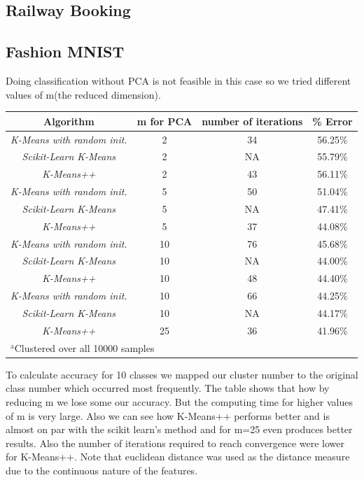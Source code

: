 \documentclass[conference]{IEEEtran}
\begin{document}
\subsection{Railway Booking}

\subsection{Fashion MNIST}
Doing classification without PCA is not feasible in this case so we tried different values of m(the reduced dimension).
\begin{table}[htbp]
\begin{center}
\begin{tabular}{|c|c|c|c|}
\hline
\textbf{Algorithm}&\textbf{m for PCA}&\textbf{number of iterations}&\textbf{\% Error} \\
\hline
\textit{K-Means with random init.} &2&34&56.25\%\\
\hline
\textit{Scikit-Learn K-Means}&2&NA&55.79\%\\
\hline
\textit{K-Means++}&2&43&56.11\%\\
\hline
\textit{K-Means with random init.} &5&50&51.04\%\\
\hline
\textit{Scikit-Learn K-Means}&5&NA&47.41\%\\
\hline
\textit{K-Means++}&5&37&44.08\%\\
\hline
\textit{K-Means with random init.} &10&76&45.68\%\\
\hline
\textit{Scikit-Learn K-Means}&10&NA&44.00\%\\
\hline
\textit{K-Means++}&10&48&44.40\%\\
\hline
\textit{K-Means with random init.} &10&66&44.25\%\\
\hline
\textit{Scikit-Learn K-Means}&10&NA&44.17\%\\
\hline
\textit{K-Means++}&25&36&41.96\%\\
\hline
\multicolumn{4}{l}{$^{\mathrm{a}}$Clustered over all 10000 samples}
\end{tabular}
\label{tab1}
\end{center}
\end{table}
\newline
To calculate accuracy for 10 classes we mapped our cluster number to the original class number which occurred most frequently.\newline
The table shows that how by reducing m we lose some our accuracy. But the computing time for higher values of m is very large. Also we can see how K-Means++ performs better and is almost on par with the scikit learn's method and for m=25 even produces better results. Also the number of iterations required to reach convergence were lower for K-Means++. Note that euclidean distance was used as the distance measure due to the continuous nature of the features.
\end{document}
